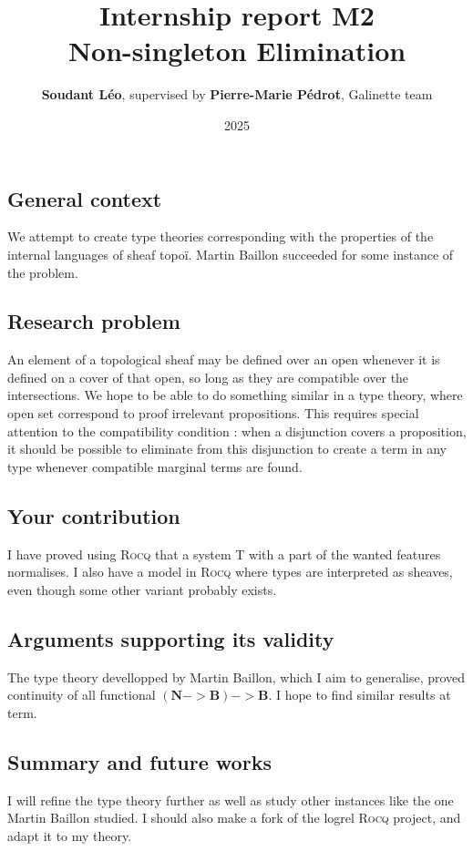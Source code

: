 \documentclass[11pt]{article}
\title{Internship report M2\\  Non-singleton Elimination\\}
\author{\textbf{Soudant L\'eo}, supervised by \textbf{Pierre-Marie P\'edrot}, Galinette team}
\date{2025}
\newcommand{\0}{\mathbf{0}}
\newcommand{\1}{\mathbf{1}}
\newcommand{\nat}{\mathbf{N}}
\newcommand{\bool}{\mathbf{B}}
\begin{document}
\begin{titlepage}
    
\maketitle

\end{titlepage}


\subsection*{General context}
We attempt to create type theories corresponding with the properties of the internal languages of sheaf topoï. Martin Baillon succeeded for some instance of the problem.
\subsection*{Research problem}
An element of a topological sheaf may be defined over an open whenever it is defined on a cover of that open, so long as they are compatible over the intersections. We hope to be able to do something similar in a type theory, where open set correspond to proof irrelevant propositions. This requires special attention to the compatibility condition : when a disjunction covers a proposition, it should be possible to eliminate from this disjunction to create a term in any type whenever compatible marginal terms are found.
\subsection*{Your contribution}
I have proved using \textsc{Rocq} that a system T with a part of the wanted features normalises. I also have a model in \textsc{Rocq} where types are interpreted as sheaves, even though some other variant probably exists.
\subsection*{Arguments supporting its validity}
The type theory devellopped by Martin Baillon, which I aim to generalise, proved continuity of all functional $(\nat -> \bool) -> \bool$. I hope to find similar results at term.
\subsection*{Summary and future works}
I will refine the type theory further as well as study other instances like the one Martin Baillon studied. I should also make a fork of the logrel \textsc{Rocq} project, and adapt it to my theory.
\newpage
\tableofcontents
\newpage
\end{document}
